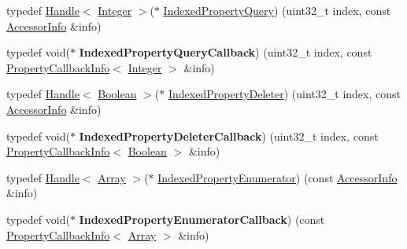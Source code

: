 \begin{DoxyCompactItemize}
\item 
typedef \hyperlink{classv8_1_1_handle}{Handle}$<$ \hyperlink{classv8_1_1_integer}{Integer} $>$($\ast$ \hyperlink{namespacev8_ac84ffd0beb05009f30378ef45a065edf}{Indexed\+Property\+Query}) (uint32\+\_\+t index, const \hyperlink{classv8_1_1_accessor_info}{Accessor\+Info} \&info)
\item 
\hypertarget{namespacev8_a980b62c33eb664783e61e25c3b27f9ee}{}typedef void($\ast$ {\bfseries Indexed\+Property\+Query\+Callback}) (uint32\+\_\+t index, const \hyperlink{classv8_1_1_property_callback_info}{Property\+Callback\+Info}$<$ \hyperlink{classv8_1_1_integer}{Integer} $>$ \&info)\label{namespacev8_a980b62c33eb664783e61e25c3b27f9ee}

\item 
typedef \hyperlink{classv8_1_1_handle}{Handle}$<$ \hyperlink{classv8_1_1_boolean}{Boolean} $>$($\ast$ \hyperlink{namespacev8_a3a7c18d62a0d1f2d12845051920be592}{Indexed\+Property\+Deleter}) (uint32\+\_\+t index, const \hyperlink{classv8_1_1_accessor_info}{Accessor\+Info} \&info)
\item 
\hypertarget{namespacev8_a53863728de14cde48dd6543207b2f2da}{}typedef void($\ast$ {\bfseries Indexed\+Property\+Deleter\+Callback}) (uint32\+\_\+t index, const \hyperlink{classv8_1_1_property_callback_info}{Property\+Callback\+Info}$<$ \hyperlink{classv8_1_1_boolean}{Boolean} $>$ \&info)\label{namespacev8_a53863728de14cde48dd6543207b2f2da}

\item 
typedef \hyperlink{classv8_1_1_handle}{Handle}$<$ \hyperlink{classv8_1_1_array}{Array} $>$($\ast$ \hyperlink{namespacev8_a15ab299eff53946ab483b762a4cb20dc}{Indexed\+Property\+Enumerator}) (const \hyperlink{classv8_1_1_accessor_info}{Accessor\+Info} \&info)
\item 
\hypertarget{namespacev8_adbb0a6d5537371953f9ba807d4f6275e}{}typedef void($\ast$ {\bfseries Indexed\+Property\+Enumerator\+Callback}) (const \hyperlink{classv8_1_1_property_callback_info}{Property\+Callback\+Info}$<$ \hyperlink{classv8_1_1_array}{Array} $>$ \&info)\label{namespacev8_adbb0a6d5537371953f9ba807d4f6275e}


\end{DoxyCompactItemize}

